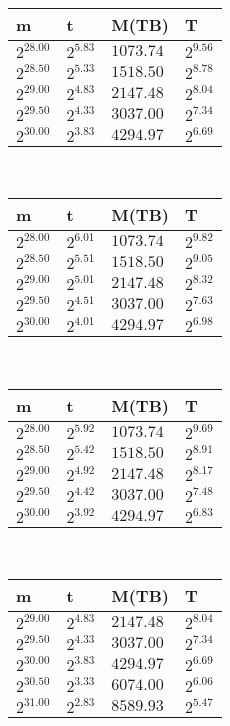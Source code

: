 \ 
\begin{tabular}{llll}
m & t & M(TB) & T \\ \hline
$2^{28.00}$ & $2^{5.83}$ & $1073.74$ & $2^{9.56}$ \\
$2^{28.50}$ & $2^{5.33}$ & $1518.50$ & $2^{8.78}$ \\
$2^{29.00}$ & $2^{4.83}$ & $2147.48$ & $2^{8.04}$ \\
$2^{29.50}$ & $2^{4.33}$ & $3037.00$ & $2^{7.34}$ \\
$2^{30.00}$ & $2^{3.83}$ & $4294.97$ & $2^{6.69}$ \\
\end{tabular}
 \ 
\begin{tabular}{llll}
m & t & M(TB) & T \\ \hline
$2^{28.00}$ & $2^{6.01}$ & $1073.74$ & $2^{9.82}$ \\
$2^{28.50}$ & $2^{5.51}$ & $1518.50$ & $2^{9.05}$ \\
$2^{29.00}$ & $2^{5.01}$ & $2147.48$ & $2^{8.32}$ \\
$2^{29.50}$ & $2^{4.51}$ & $3037.00$ & $2^{7.63}$ \\
$2^{30.00}$ & $2^{4.01}$ & $4294.97$ & $2^{6.98}$ \\
\end{tabular}
 \ 
\begin{tabular}{llll}
m & t & M(TB) & T \\ \hline
$2^{28.00}$ & $2^{5.92}$ & $1073.74$ & $2^{9.69}$ \\
$2^{28.50}$ & $2^{5.42}$ & $1518.50$ & $2^{8.91}$ \\
$2^{29.00}$ & $2^{4.92}$ & $2147.48$ & $2^{8.17}$ \\
$2^{29.50}$ & $2^{4.42}$ & $3037.00$ & $2^{7.48}$ \\
$2^{30.00}$ & $2^{3.92}$ & $4294.97$ & $2^{6.83}$ \\
\end{tabular}
 \ 
\begin{tabular}{llll}
m & t & M(TB) & T \\ \hline
$2^{29.00}$ & $2^{4.83}$ & $2147.48$ & $2^{8.04}$ \\
$2^{29.50}$ & $2^{4.33}$ & $3037.00$ & $2^{7.34}$ \\
$2^{30.00}$ & $2^{3.83}$ & $4294.97$ & $2^{6.69}$ \\
$2^{30.50}$ & $2^{3.33}$ & $6074.00$ & $2^{6.06}$ \\
$2^{31.00}$ & $2^{2.83}$ & $8589.93$ & $2^{5.47}$ \\
\end{tabular}
